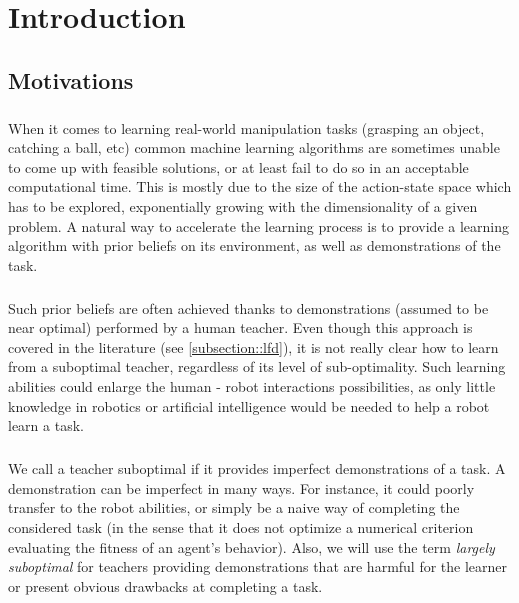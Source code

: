 \documentclass[a4paper]{report}
\begin{document}
	
	
	\tableofcontents
	\begingroup
\let\clearpage\relax
	\listoffigures
\endgroup

	\chapter{Introduction}
	{
		\section{Motivations}
		{
			\paragraph{} When it comes to learning real-world manipulation tasks (grasping an object, catching a ball, etc) common machine learning algorithms are sometimes unable to come up with feasible solutions, or at least fail to do so in an acceptable computational time. This is mostly due to the size of the action-state space which has to be explored, exponentially growing with the dimensionality of a given problem.  A natural way to accelerate the learning process is to provide a learning algorithm with prior beliefs on its environment, as well as demonstrations of the task.
			
			\paragraph{} Such prior beliefs are often achieved thanks to demonstrations (assumed to be near optimal) performed by a human teacher. Even though this approach is covered in the literature (see \ref{subsection::lfd}), it is not really clear how to learn from a suboptimal teacher, regardless of its level of sub-optimality. Such learning abilities could enlarge the human - robot interactions possibilities, as only little knowledge in robotics or artificial intelligence would be needed to help a robot learn a task. 
			
			\paragraph{} We call a teacher suboptimal if it provides imperfect demonstrations of a task. A demonstration can be imperfect in many ways. For instance, it could poorly transfer to the robot abilities, or simply be a naive way of completing the considered task (in the sense that it does not optimize a numerical criterion evaluating the fitness of an agent's behavior). Also, we will use the term \emph{largely suboptimal} for teachers providing demonstrations that are harmful for the learner or present obvious drawbacks at completing a task. 
			
}}
\end{document}
